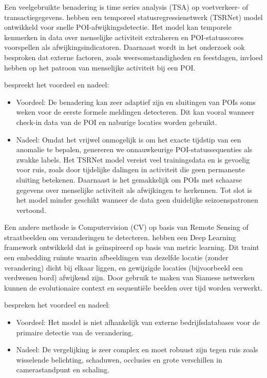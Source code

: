 Een veelgebruikte benadering is time series analysis (TSA) op voetverkeer- of transactiegegevens. \textcite{Yao2024} hebben een temporeel statusregressienetwerk (TSRNet) model ontwikkeld voor snelle POI-afwijkingsdetectie. Het model kan temporele kenmerken in data over menselijke activiteit extraheren en POI-statusscores voorspellen als afwijkingsindicatoren. Daarnaast wordt in het onderzoek ook besproken dat externe factoren, zoals weersomstandigheden en feestdagen, invloed hebben op het patroon van menselijke activiteit bij een POI. 

\textcite{Yao2024} bespreekt het voordeel en nadeel:
\begin{itemize}
  \item Voordeel: De benadering kan zeer adaptief zijn en sluitingen van POIs soms weken voor de eerste formele meldingen detecteren. Dit kan vooral wanneer check-in data van de POI en naburige locaties worden gebruikt.
  \item Nadeel: Omdat het vrijwel onmogelijk is om het exacte tijdstip van een anomalie te bepalen, genereren we onnauwkeurige POI-statussequenties als zwakke labels. Het TSRNet model vereist veel trainingsdata en is gevoelig voor ruis, zoals door tijdelijke dalingen in activiteit die geen permanente sluiting betekenen. Daarnaast is het gemakkelijk om POIs met schaarse gegevens over menselijke activiteit als afwijkingen te herkennen. Tot slot is het model minder geschikt wanneer de data geen duidelijke seizoenspatronen vertoond.
\end{itemize}

Een andere methode is Computervision (CV) op basis van Remote Sensing of straatbeelden om veranderingen te detecteren. \textcite{Revaud2019} hebben een Deep Learning framework ontwikkeld dat is geïnspireerd op basis van metric learning. Dit traint een embedding ruimte waarin afbeeldingen van dezelfde locatie (zonder verandering) dicht bij elkaar liggen, en gewijzigde locaties (bijvoorbeeld een verdwenen bord) afwijkend zijn. Door gebruik te maken van Siamese netwerken kunnen de evolutionaire context en sequentiële beelden over tijd worden verwerkt.

\textcite{Revaud2019} bespreken het voordeel en nadeel: 
\begin{itemize}   
    \item Voordeel: Het model is niet afhankelijk van externe bedrijfsdatabases voor de primaire detectie van de verandering.   
    \item Nadeel: De vergelijking is zeer complex en moet robuust zijn tegen ruis zoals wisselende belichting, schaduwen, occlusies en grote verschillen in camerastandpunt en schaling. 
\end{itemize}

